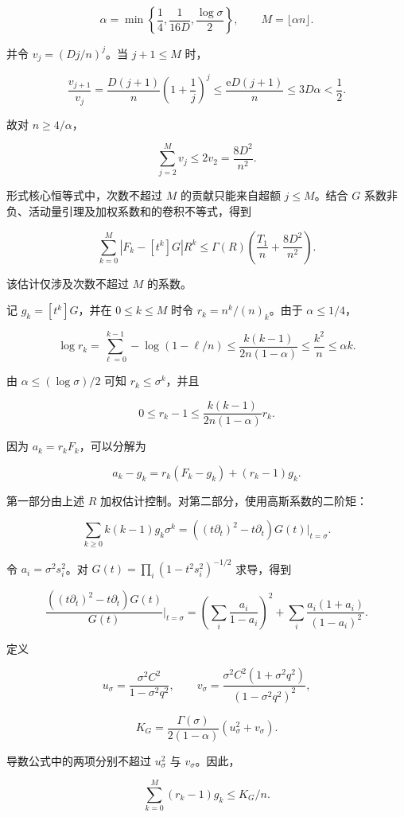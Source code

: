\documentclass[11pt,a4paper]{article}
\begin{document}
\[\alpha=\min\left\{\frac14,\frac1{16D},\frac{\log\sigma}{2}\right\},
\qquad M=\lfloor\alpha n\rfloor.\]

并令 \(v_j=(Dj/n)^j\)。当 \(j+1\le M\) 时，

\[\frac{v_{j+1}}{v_j}
=\frac{D(j+1)}n\left(1+\frac1j\right)^j
\le\frac{\mathrm e D(j+1)}n
\le3D\alpha<\frac12.\]

故对 \(n\ge4/\alpha\)，

\[\sum_{j=2}^{M}v_j\le2v_2=\frac{8D^2}{n^2}.\]

形式核心恒等式中，次数不超过 \(M\) 的贡献只能来自超额 \(j\le M\)。结合 \(G\) 系数非负、活动量引理及加权系数和的卷积不等式，得到

\[\sum_{k=0}^{M}|F_k-[t^k]G|R^k
\le\Gamma(R)\left(\frac{T_1}n+\frac{8D^2}{n^2}\right).\]

该估计仅涉及次数不超过 \(M\) 的系数。

记 \(g_k=[t^k]G\)，并在 \(0\le k\le M\) 时令 \(r_k=n^k/(n)_k\)。由于 \(\alpha\le1/4\)，

\[\log r_k
=\sum_{\ell=0}^{k-1}-\log(1-\ell/n)
\le\frac{k(k-1)}{2n(1-\alpha)}
\le\frac{k^2}n
\le\alpha k.\]

由 \(\alpha\le(\log\sigma)/2\) 可知 \(r_k\le\sigma^k\)，并且

\[0\le r_k-1
\le\frac{k(k-1)}{2n(1-\alpha)}r_k.\]

因为 \(a_k=r_kF_k\)，可以分解为

\[a_k-g_k=r_k(F_k-g_k)+(r_k-1)g_k.\]

第一部分由上述 \(R\) 加权估计控制。对第二部分，使用高斯系数的二阶矩：

\[\sum_{k\ge0}k(k-1)g_k\sigma^k
=\left((t\partial_t)^2-t\partial_t\right)G(t)\big|_{t=\sigma}.\]

令 \(a_i=\sigma^2s_i^2\)。对 \(G(t)=\prod_i(1-t^2s_i^2)^{-1/2}\) 求导，得到

\[\frac{\left((t\partial_t)^2-t\partial_t\right)G(t)}{G(t)}
\bigg|_{t=\sigma}
=\left(\sum_i\frac{a_i}{1-a_i}\right)^2
+\sum_i\frac{a_i(1+a_i)}{(1-a_i)^2}.\]

定义

\[u_\sigma=\frac{\sigma^2C^2}{1-\sigma^2q^2},
\qquad
v_\sigma=\frac{\sigma^2C^2(1+\sigma^2q^2)}
{(1-\sigma^2q^2)^2},\]

\[K_G=\frac{\Gamma(\sigma)}{2(1-\alpha)}
\left(u_\sigma^2+v_\sigma\right).\]

导数公式中的两项分别不超过 \(u_\sigma^2\) 与 \(v_\sigma\)。因此，

\[\sum_{k=0}^{M}(r_k-1)g_k\le K_G/n.\]
\end{document}
